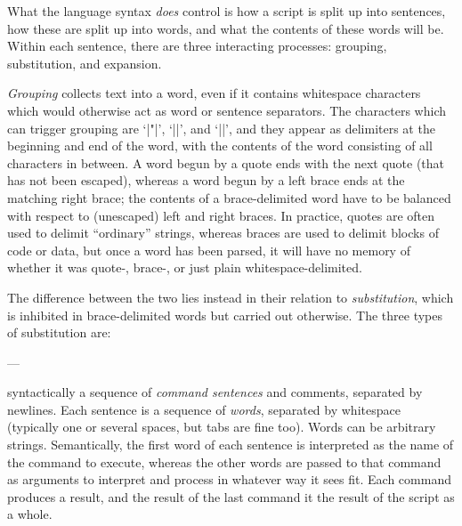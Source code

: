 \documentclass{mtmtcl}
\theoremstyle{plain}
\theoremstyle{remark}
\begin{document}
What the language syntax \emph{does} control is how a script is split 
up into sentences, how these are split up into words, and what the 
contents of these words will be. Within each sentence, there are 
three interacting processes: grouping, substitution, and expansion.

\emph{Grouping} collects text into a word, even if it contains whitespace 
characters which would otherwise act as word or sentence separators. 
The characters which can trigger grouping are `|"|', `|{|', and 
`|}|', and they appear as delimiters at the beginning and end of the 
word, with the contents of the word consisting of all characters in 
between. A word begun by a quote ends with the next quote (that has 
not been escaped), whereas a word begun by a left brace ends at the 
matching right brace; the contents of a brace-delimited word have to 
be balanced with respect to (unescaped) left and right braces. In 
practice, quotes are often used to delimit ``ordinary'' strings, 
whereas braces are used to delimit blocks of code or data, but once a 
word has been parsed, it will have no memory of whether it was 
quote-, brace-, or just plain whitespace-delimited.

The difference between the two lies instead in their relation to 
\emph{substitution}, which is inhibited in brace-delimited words but 
carried out otherwise. The three types of substitution are:

---

syntactically a sequence of 
\emph{command sentences} and comments, separated by newlines. Each 
sentence is a sequence of \emph{words}, separated by whitespace 
(typically one or several spaces, but tabs are fine too). Words can 
be arbitrary strings. Semantically, the first word of each sentence 
is interpreted as the name of the command to execute, whereas the 
other words are passed to that command as arguments to interpret 
and process in whatever way it sees fit. Each command produces 
a result, and the result of the last command it the result of the 
script as a whole.
\end{document}
